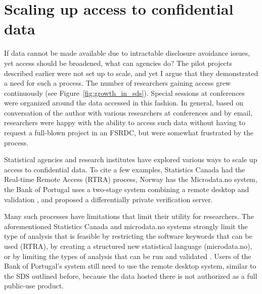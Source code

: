 \documentclass[inline]{hdsr}
\begin{document}
\section{Scaling up access to confidential data}

If data cannot be made available due to intractable disclosure avoidance issues, yet access should be broadened, what can agencies do? 
The pilot projects described earlier were not set up to scale, and yet I argue that  they demonstrated  a need for such a process. The number of researchers gaining access grew continuously (see Figure~\ref{fig:growth_in_sds}). Special sessions at conferences were organized around the data accessed in this fashion. In general, based on conversation of the author with various researchers at conferences and by email, researchers were happy with the ability to access such data without having to request a full-blown project in an FSRDC, but were somewhat frustrated by the process. 


Statistical agencies and research institutes have explored various ways to scale up access to confidential data. To cite a few examples, Statistics Canada had the Real-time Remote Access (RTRA) process, Norway has the Microdata.no system, the Bank of Portugal uses a two-stage system combining a remote desktop and validation \citep{guimaraes_reproducibility_2023}, and \citet{barrientos_providing_2018} proposed a differentially private verification server. 

Many such processes have limitations that limit their utility for researchers. The aforementioned Statistics Canada and microdata.no systems strongly limit the type of analysis that is feasible by restricting the software keywords that can be used (RTRA), by creating a structured new statistical language (microdata.no), or by limiting the types of analysis that can be run and validated \citep{barrientos_providing_2018}. Users of the Bank of Portugal's system still need to use the remote desktop system, similar to the SDS outlined before, because the data hosted there is not authorized as a full public-use product.
\end{document}
